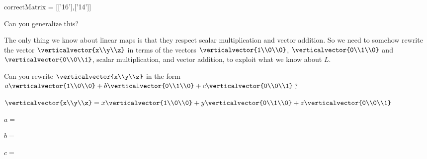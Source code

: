 \documentclass{ximera}
\begin{document}
\begin{question}
\begin{solution}
    \begin{matrix-answer}[name=v]
      correctMatrix = [['16'],['14']]
    \end{matrix-answer}
    
  \end{solution}

  Can you generalize this?

  \begin{solution}
  \begin{hint}	
  		The only thing we know about linear maps is that they respect scalar multiplication and vector addition.  So we need to somehow rewrite the vector
  		$\verticalvector{x\\y\\z}$ in terms of the vectors $\verticalvector{1\\0\\0}$, $\verticalvector{0\\1\\0}$ and $\verticalvector{0\\0\\1}$, scalar multiplication,
  		and vector addition, to exploit what we know about $L$.
  		
  		
  		
  		\begin{question}
  			Can you rewrite $\verticalvector{x\\y\\z}$ in the form $a\verticalvector{1\\0\\0}+b\verticalvector{0\\1\\0}+c\verticalvector{0\\0\\1}$?
  			\begin{solution}
  				\begin{hint}
  					$\verticalvector{x\\y\\z} = x\verticalvector{1\\0\\0}+y\verticalvector{0\\1\\0}+z\verticalvector{0\\0\\1}$
  				\end{hint}
  				$a =$ 
  			\end{solution}
  			\begin{solution}
  				$b=$ \answer{y}
  			\end{solution}
  			\begin{solution}
  				$c=$ \answer{z}
  			\end{solution}
  		\end{question}
  		

\end{hint}
\end{solution}
\end{question}
\end{document}
